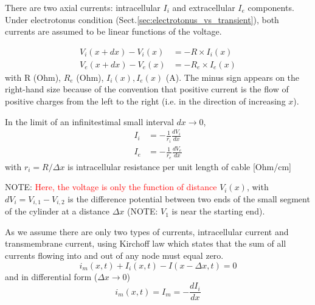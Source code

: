 There are two axial currents: intracellular $I_i$ and extracellular $I_e$
components. Under electrotonus condition
(Sect.\ref{sec:electrotonus_vs_transient}), both currents are assumed to be
linear functions of the voltage.

\begin{equation}
  \label{eq:421}
  \begin{split}
    V_i(x+dx)-V_i(x) &= -R \times I_i(x)\\
    V_e(x+dx)-V_e(x) &= -R_e \times I_e(x)
  \end{split}
\end{equation}
with R (Ohm), $R_e$ (Ohm), $I_i(x), I_e(x)$ (A).
The minus sign appears on the right-hand size because of the convention that
positive current is the flow of positive charges from the left to the right
(i.e. in the direction of increasing $x$).

In the limit of an infinitestimal small interval $dx \rightarrow 0$,
\begin{equation}
  \label{eq:422}
  \begin{split}
    I_i &= -\frac{1}{r_i}\frac{d V_i}{d x} \\
    I_e &= -\frac{1}{r_e}\frac{d V_e}{d x} 
  \end{split}
\end{equation}
with $r_i = R/\Delta x$ is intracellular resistance per unit length of cable
[Ohm/cm]

NOTE: \textcolor{red}{Here, the voltage is only the function of distance}
$V_i(x)$, 
with $d  V_i = V_{i,1}-V_{i,2}$ is 
the difference potential between two
ends of the small segment of the cylinder at a distance $\Delta x$ 
(NOTE: $V_1$ is near the starting end). 

As we assume there are only two types of currents, intracellular
current and transmembrane current, using Kirchoff law which states that the sum
of all currents flowing into and out of any node must equal zero.
\begin{equation}
i_m(x,t) + I_i(x,t) - I (x-\Delta x, t) = 0
\end{equation}
and in differential form ($\Delta x \rightarrow 0$)
\begin{equation}
  \label{eq:43}
  i_m(x,t) = I_m =   -\frac{dI_i}{dx} 
\end{equation}

